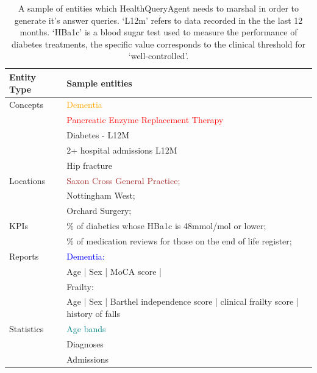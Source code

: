\documentclass[11pt]{article}
\begin{document}





\begin{table}[t]
\centering
	\begin{tabular}{|p{2cm}|p{5cm}|}
\hline
	Entity Type & Sample entities \\

\hline
\hline
	Concepts 	& \textcolor{orange}{Dementia} \\
	 	        & \textcolor{red}{Pancreatic Enzyme Replacement Therapy} \\
			& Diabetes - L12M \\
			& 2+ hospital admissions L12M \\
			& Hip fracture \\ 
\hline
	Locations	& \textcolor{brown}{Saxon Cross General Practice;}\\	
			& Nottingham West; \\
			& Orchard Surgery; \\
\hline
	KPIs		& \% of diabetics whose HBa1c is 48mmol/mol or lower; \\
	 		& \% of medication reviews for those on the end of life register; \\	
\hline
	Reports		& \textcolor{blue}{Dementia:} \\
			& Age | Sex | MoCA score | \\
			& Frailty: \\
			& Age | Sex | Barthel independence score | clinical frailty score | history of falls \\
\hline
	Statistics	& \textcolor{teal}{Age bands} \\
			& Diagnoses \\
			& Admissions \\
\hline
\end{tabular}

\caption{
	A sample of entities which HealthQueryAgent needs to marshal in order to generate it's answer queries.
	`L12m' refers to data recorded in the the last 12 months.
	`HBa1c' is a blood sugar test used to measure the performance of diabetes treatments, the specific value corresponds to the clinical threshold for `well-controlled'.
}
	\label{tab:sample-entities}
\end{table}
\end{document}
